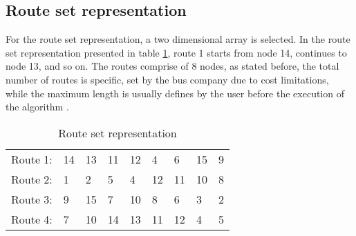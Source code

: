 \subsection{Route set representation}
For the route set representation, a two dimensional array is selected. In the route set representation presented in table \ref{table:routeSetRepr}, route 1 starts from node 14, continues to node 13, and so on. The routes comprise of 8 nodes, as stated before, the total number of routes is specific, set by the bus company due to cost limitations, while the maximum length is usually defines by the user before the execution of the algorithm \citep{kechagiopoulos14}.
\begin{table}[H]
    \begin{center}
        \begin{tabular}{|l| l l l l l l l l|}
      \hline
        Route 1: & 14 & 13 & 11 & 12 & 4 & 6 & 15 & 9 \\
        Route 2: & 1 & 2 & 5 & 4 & 12 & 11 & 10 & 8 \\
        Route 3: & 9 & 15 & 7 & 10 & 8 & 6 & 3 & 2 \\
        Route 4: & 7 & 10 & 14 & 13 & 11 & 12 & 4 & 5 \\
      \hline
        \end{tabular}
    \end{center}
    \caption {Route set representation}
    \label{table:routeSetRepr}
\end{table}
